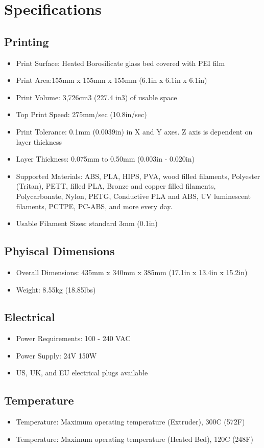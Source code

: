 %
%
%
%
%

\section{Specifications}

\subsection{Printing}
\begin{itemize}
\item Print Surface: Heated Borosilicate glass bed covered with PEI film
\item Print Area:155mm x 155mm x 155mm (6.1in x 6.1in x 6.1in)
\item Print Volume: 3,726cm3 (227.4 in3) of usable space
\item Top Print Speed: 275mm/sec (10.8in/sec)
\item Print Tolerance: 0.1mm (0.0039in) in X and Y axes. Z axis is dependent on layer thickness
\item Layer Thickness: 0.075mm to 0.50mm (0.003in - 0.020in)
\item Supported Materials: ABS, PLA, HIPS, PVA, wood filled filaments, Polyester (Tritan), PETT, filled PLA, Bronze and copper filled filaments, Polycarbonate, Nylon, PETG, Conductive PLA and ABS, UV luminescent filaments, PCTPE, PC-ABS, and more every day.
\item Usable Filament Sizes: standard 3mm (0.1in)
\end{itemize}
\subsection{Phyiscal Dimensions}
\begin{itemize}
\item Overall Dimensions: 435mm x 340mm x 385mm (17.1in x 13.4in x 15.2in)
\item Weight: 8.55kg (18.85lbs)
\end{itemize}
\subsection{Electrical}
\begin{itemize}
\item Power Requirements: 100 - 240 VAC
\item Power Supply: 24V 150W
\item US, UK, and EU electrical plugs available
\end{itemize}
\subsection{Temperature}
\begin{itemize}
\item Temperature: Maximum operating temperature (Extruder), 300C (572F)
\item Temperature: Maximum operating temperature (Heated Bed), 120C (248F)
\end{itemize}

